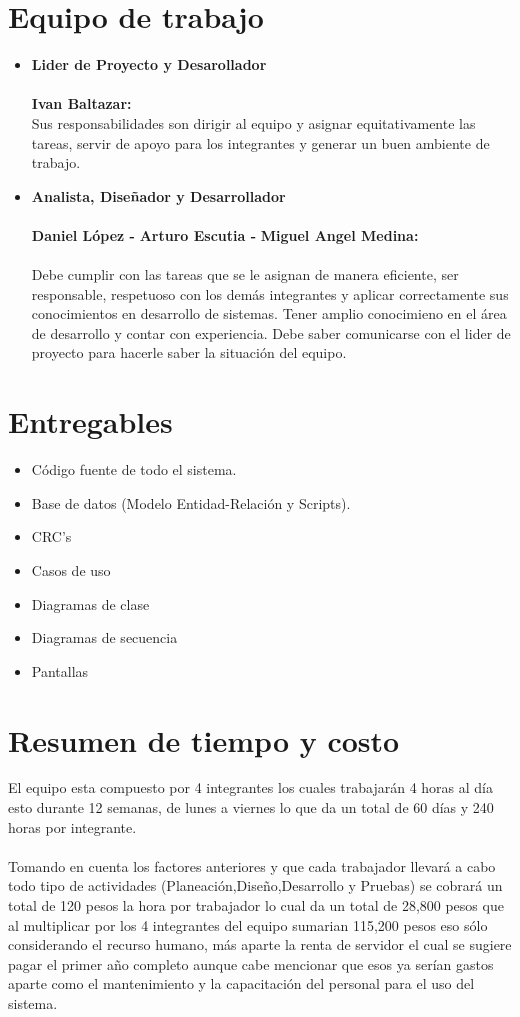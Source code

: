 \section{Equipo de trabajo}
\begin{itemize}
	\item \textbf{Lider de Proyecto y Desarollador}
	\\\\
	\textbf{Ivan Baltazar:} 
	\\ Sus responsabilidades son dirigir al equipo y asignar equitativamente las tareas, servir de apoyo para los integrantes y generar un buen ambiente de trabajo.
	\item\textbf{ Analista, Diseñador y Desarrollador}
	\\\\
	\textbf{{Daniel López -}}
	\textbf{Arturo Escutia -} 
	\textbf{Miguel Angel Medina:} 
	\\ \\ Debe cumplir con las tareas que se le asignan de manera eficiente, ser responsable, respetuoso con los demás integrantes y aplicar correctamente sus conocimientos en desarrollo de sistemas. Tener amplio conocimieno en el área de desarrollo y contar con experiencia. Debe saber comunicarse con el lider de proyecto para hacerle saber la situación del equipo.
\end{itemize}	

\section{Entregables}
\begin{itemize}
	\item Código fuente de todo el sistema.
	\item Base de datos (Modelo Entidad-Relación y Scripts).
	\item CRC’s
	\item Casos de uso
	\item Diagramas de clase
	\item Diagramas de secuencia
	\item Pantallas
\end{itemize}
\section{Resumen de tiempo y costo}
El equipo esta compuesto por 4 integrantes los cuales trabajarán 4 horas al día esto durante 12 semanas, de lunes a viernes lo que da un total de 60 días y 240 horas por integrante. 
\\\\
Tomando en cuenta los factores anteriores y que cada trabajador llevará a cabo todo tipo de actividades (Planeación,Diseño,Desarrollo y Pruebas) se cobrará un total de 120 pesos la hora por trabajador lo cual da un total de 28,800 pesos que al multiplicar por los 4 integrantes del equipo sumarian 115,200 pesos eso sólo considerando el recurso humano, más aparte la renta de servidor el cual se sugiere pagar el primer año completo aunque cabe mencionar que esos ya serían gastos aparte como el mantenimiento y la capacitación del personal para el uso del sistema.
